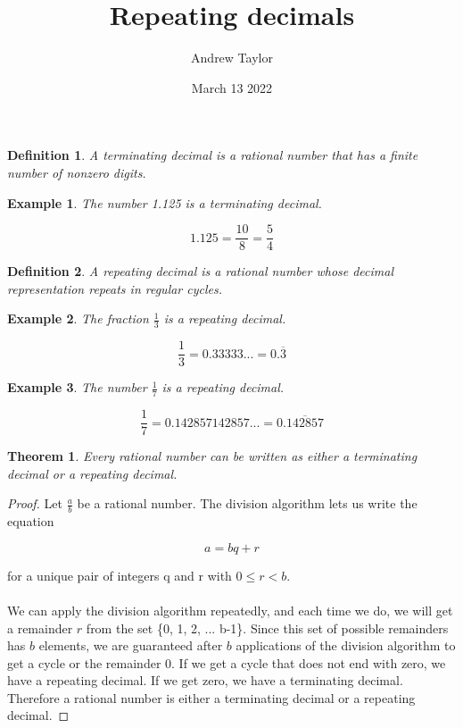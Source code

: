 \documentclass{article}
\title{Repeating decimals}
\author{Andrew Taylor}
\date{March 13 2022}
\newtheorem{definition}{Definition}
\newtheorem{theorem}{Theorem}
\newtheorem{example}{Example}
\begin{document}
\maketitle

\begin{definition}
A terminating decimal is a rational number that has a finite number of nonzero digits.
\end{definition}

\begin{example}
The number 1.125 is a terminating decimal. 

\begin{equation*}
1.125 = \frac{10}{8} = \frac{5}{4}
\end{equation*}

\end{example}

\begin{definition}
A repeating decimal is a rational number whose decimal representation repeats in regular cycles.
\end{definition}

\begin{example}
The fraction $\displaystyle \frac{1}{3}$ is a repeating decimal.

\begin{equation*}
\frac{1}{3} = 0.33333... = 0.\overline{3}
\end{equation*}

\end{example}

\begin{example}
The number $\displaystyle \frac{1}{7}$ is a repeating decimal.
\end{example}

\begin{equation*}
\frac{1}{7} = 0.142857142857... = 0.\overline{142857}
\end{equation*}

\begin{theorem}
Every rational number can be written as either a terminating decimal or a repeating decimal.
\end{theorem}

\begin{proof}
Let $\displaystyle \frac{a}{b}$ be a rational number. The division algorithm lets us write the equation 

\begin{equation*}
a = bq + r
\end{equation*}

for a unique pair of integers q and r with $0 \le r < b$.
\\
\\
We can apply the division algorithm repeatedly, and each time we do, we will get a remainder $r$ from the set \{0, 1, 2, ... b-1\}. Since this set of possible remainders has $b$ elements, we are guaranteed after $b$ applications of the division algorithm to get a cycle or the remainder 0. If we get a cycle that does not end with zero, we have a repeating decimal. If we get zero, we have a terminating decimal. Therefore a rational number is either a terminating decimal or a repeating decimal.
\end{proof}
\end{document}
